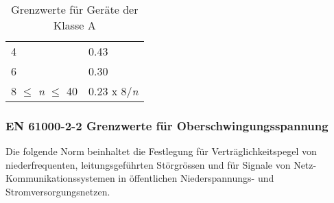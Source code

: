 \begin{table}[ht!]
\begin{tabular}{|l|l|}
		4                                            & 0.43                                                                                                                \\
		6                                            & 0.30                                                                                                                \\
		8 $\leq$ \textit{n} $\leq$ 40                & 0.23 x 8/\textit{n}                                                                                                 \\ \hline
	\end{tabular}
\caption{Grenzwerte für Geräte der Klasse A}\label{tab:Grenzwerte_Normen}
\end{table}





\subsubsection{EN 61000-2-2 Grenzwerte für Oberschwingungsspannung}\label{sec:Spannungsnormen}

Die folgende Norm beinhaltet die Festlegung für Verträglichkeitspegel von niederfrequenten, leitungsgeführten Störgrössen und für Signale von Netz-Kommunikationssystemen in öffentlichen Niederspannungs- und Stromversorgungsnetzen. 

